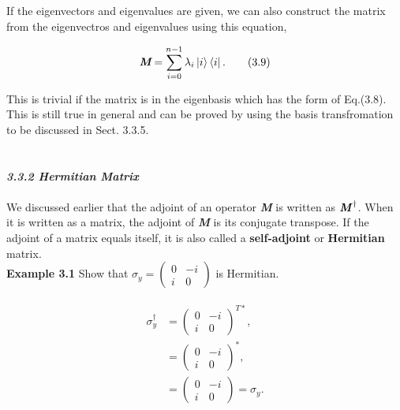\documentclass{article}
\begin{document}
If the eigenvectors and eigenvalues are given, we can also construct the matrix from the eigenvectros and eigenvalues using this equation,

\begin{equation} \label{eq 3.9}
    \textit{\textbf{M}}=\sum_{i=0}^{n-1}\lambda_{i}\ket{i}\bra{i}. \tag{3.9}
\end{equation}


This is trivial if the matrix is in the eigenbasis which has the form of Eq.(3.8). This is still true in general and can be proved by using the basis transfromation to be discussed in Sect. 3.3.5.
\\
\\
\\
\textit{\textbf{\large 3.3.2 Hermitian Matrix}}
\\
\\
We discussed earlier that the adjoint of an operator \textbf{\textit{M}} is written as 
$\textbf{\textit{M}}^{\dagger}$. When it is written as a matrix, the adjoint of \textbf{\textit{M}}
is its conjugate transpose. If the adjoint of a matrix equals itself, it is also called a \textbf{self-adjoint}
or \textbf{Hermitian} matrix. 
\\
\textbf{Example 3.1} Show that $\sigma_{y}=\begin{pmatrix}
    0 & -i\\ i &0
\end{pmatrix}$ is Hermitian.

\begin{align} \label{eq 3.10}
    \begin{split}
        \sigma_{y}^\dagger&=\begin{pmatrix}
            0 & -i\\ i &0 
        \end{pmatrix}^{T*},\\
        &=\begin{pmatrix}
            0 & -i\\ i &0
        \end{pmatrix}^*,\\
        &=\begin{pmatrix}
        0 & -i\\ i &0
        \end{pmatrix}
        = \sigma_{y}.
    \end{split} \tag {3.10}
\end{align} 
\end{document}
